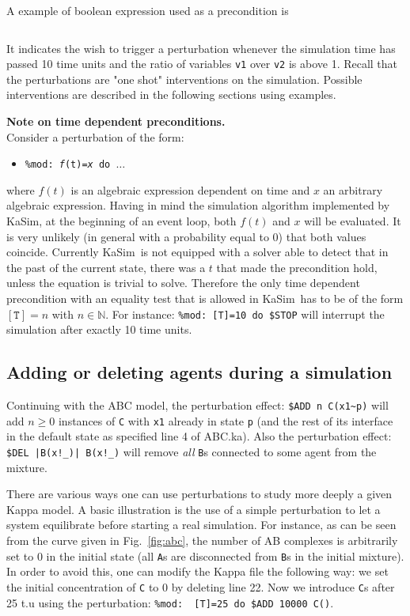 \documentclass[11pt]{book}
\def\KaSim{\textsf{KaSim}}
\def\ttt#1{\texttt{#1}}
\def\ITE#1{\begin{itemize}#1\end{itemize}}
\def\Nat{\mathbb N}
\begin{document}
A example of boolean expression used as a precondition is
\begin{lstlisting}[language=kappa]
%mod: ([T]>10) && ('v1' / 'v2') > 1 do ...
\end{lstlisting}

It indicates the wish to trigger a perturbation whenever the simulation
time has passed 10 time units and the ratio of variables \ttt{v1} over
\ttt{v2} is above 1. Recall that the perturbations are "one shot"
interventions on the simulation. Possible interventions are described
in the following sections using examples.

\textbf{Note on time dependent preconditions.}
\\Consider a perturbation of the form:
\ITE{
\item[] \ttt{\%mod: {\it f}(t)={\it x} do $\dots$}
}
where $f(t)$ is an algebraic expression dependent on time and $x$ an arbitrary algebraic expression. Having in mind the simulation algorithm implemented by \KaSim, at the beginning of an event loop, both $f(t)$ and $x$ will be evaluated. It is very unlikely (in general with a probability equal to 0) that both values coincide. Currently \KaSim~is not equipped with a solver able to detect that in the past of the current state, there was a $t$ that made the precondition hold, unless the equation is trivial to solve. Therefore the only time dependent precondition with an equality test that is allowed in \KaSim~has to be of the form $\mathtt{[T]=}n$ with $n\in\Nat$. For instance:
\lstinline[language=kappa]*%mod: [T]=10 do $STOP*
will interrupt the simulation after exactly 10 time units.

\subsection{Adding or deleting agents during a simulation}

Continuing with the ABC model, the perturbation effect:
\lstinline[language=kappa]*$ADD n C(x1~p)*
will add $n\geq 0$ instances of \ttt{C} with \ttt{x1} already in state \ttt{p} (and the rest of its interface in the default state as specified line 4 of ABC.ka). Also the perturbation effect:
\lstinline[language=kappa]*$DEL |B(x!_)| B(x!_)*
will remove \emph{all} \ttt{B}s connected to some agent from the mixture.

There are various ways one can use perturbations to study more deeply a given Kappa model. A basic illustration is the use of a simple perturbation to let a system equilibrate before starting a real simulation. For instance, as can be seen from the curve given in Fig.~\ref{fig:abc}, the number of AB complexes is arbitrarily set to 0 in the initial state (all \ttt{A}s are disconnected from \ttt{B}s in the initial mixture). In order to avoid this, one can modify the Kappa file the following way: we set the initial concentration of \ttt{C} to 0 by deleting line 22. Now we introduce \ttt{C}s after 25 t.u using the perturbation:
\lstinline[language=kappa]*%mod:  [T]=25 do $ADD 10000 C()*.
\end{document}
